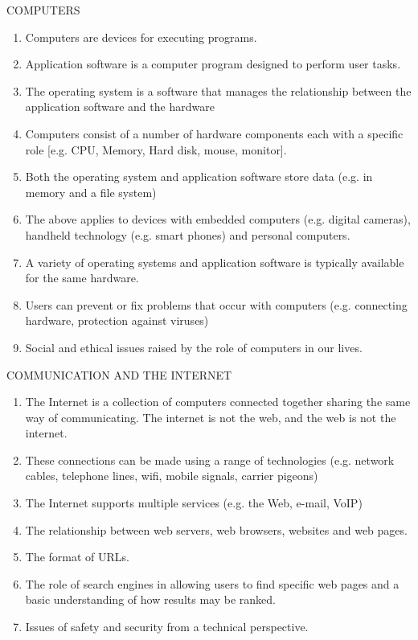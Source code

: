 COMPUTERS
\begin{enumerate}
\item Computers are devices for executing programs.
\item Application software is a computer program designed to perform user tasks.
\item The operating system is a software that manages the relationship between the
application software and the hardware
\item Computers consist of a number of hardware components each with a specific role
[e.g. CPU, Memory, Hard disk, mouse, monitor].
\item Both the operating system and application software store data (e.g. in memory and a
file system)
\item The above applies to devices with embedded computers (e.g. digital cameras),
handheld technology (e.g. smart phones) and personal computers.
\item A variety of operating systems and application software is typically available for the
same hardware.
\item Users can prevent or fix problems that occur with computers (e.g. connecting
hardware, protection against viruses)
\item Social and ethical issues raised by the role of computers in our lives.
\end{enumerate}

COMMUNICATION AND THE INTERNET
\begin{enumerate}
\item The Internet is a collection of computers connected together sharing the same way
of communicating. The internet is not the web, and the web is not the internet.
\item These connections can be made using a range of technologies (e.g. network cables,
telephone lines, wifi, mobile signals, carrier pigeons)
\item The Internet supports multiple services (e.g. the Web, e-mail, VoIP)
\item The relationship between web servers, web browsers, websites and web pages.
\item The format of URLs.
\item The role of search engines in allowing users to find specific web pages and a basic
understanding of how results may be ranked.
\item Issues of safety and security from a technical perspective.
\end{enumerate}

